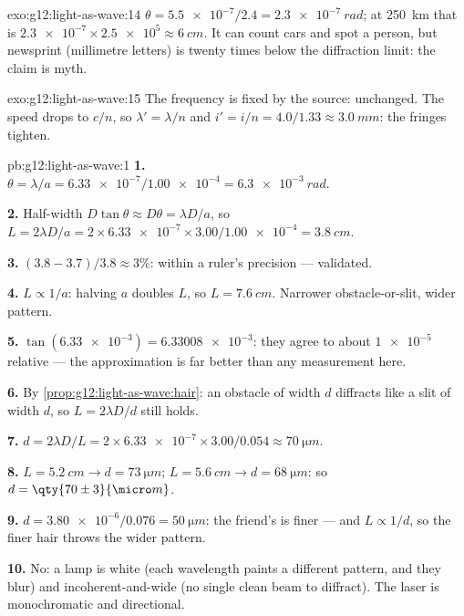 \begin{solution}{exo:g12:light-as-wave:14}
$\theta = \num{5.5e-7}/2.4 = \qty{2.3e-7}{rad}$; at \qty{250}{km}
that is $\num{2.3e-7} \times \num{2.5e5} \approx \qty{6}{cm}$. It can
count cars and spot a person, but newsprint (millimetre letters) is
twenty times below the diffraction limit: the claim is myth.
\end{solution}

\begin{solution}{exo:g12:light-as-wave:15}
The frequency is fixed by the source: unchanged. The speed drops to
$c/n$, so $\lambda' = \lambda/n$ and
$i' = i/n = 4.0/1.33 \approx \qty{3.0}{mm}$: the fringes tighten.
\end{solution}

\begin{solution}{pb:g12:light-as-wave:1}
\textbf{1.} $\theta = \lambda/a = \num{6.33e-7}/\num{1.00e-4} =
\qty{6.3e-3}{rad}$.

\textbf{2.} Half-width $D\tan\theta \approx D\theta = \lambda D/a$,
so $L = 2\lambda D/a = 2 \times \num{6.33e-7} \times
3.00/\num{1.00e-4} = \qty{3.8}{cm}$.

\textbf{3.} $(3.8 - 3.7)/3.8 \approx 3\%$: within a ruler's
precision --- validated.

\textbf{4.} $L \propto 1/a$: halving $a$ doubles $L$, so
$L = \qty{7.6}{cm}$. Narrower obstacle-or-slit, wider pattern.

\textbf{5.} $\tan(\num{6.33e-3}) = \num{6.33008e-3}$: they agree to
about $\num{1e-5}$ relative --- the approximation is far better than
any measurement here.

\textbf{6.} By \cref{prop:g12:light-as-wave:hair}: an obstacle of width
$d$ diffracts like a slit of width $d$, so $L = 2\lambda D/d$ still
holds.

\textbf{7.} $d = 2\lambda D/L = 2 \times \num{6.33e-7} \times
3.00/0.054 \approx \qty{70}{\micro m}$.

\textbf{8.} $L = \qty{5.2}{cm} \to d = \qty{73}{\micro m}$;
$L = \qty{5.6}{cm} \to d = \qty{68}{\micro m}$: so
$d = \qty{70 \pm 3}{\micro m}$.

\textbf{9.} $d = \num{3.80e-6}/0.076 = \qty{50}{\micro m}$: the
friend's is finer --- and $L \propto 1/d$, so the finer hair throws
the wider pattern.

\textbf{10.} No: a lamp is white (each wavelength paints a different
pattern, and they blur) and incoherent-and-wide (no single clean beam
to diffract). The laser is monochromatic and directional.


\end{solution}
